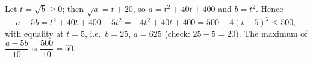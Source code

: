 Let $t=\sqrt b\ge0$; then $\sqrt a=t+20$, so $a=t^2+40t+400$ and $b=t^2$. Hence
\[
a-5b=t^2+40t+400-5t^2=-4t^2+40t+400=500-4(t-5)^2\le500,
\]
with equality at $t=5$, i.e.\ $b=25$, $a=625$ (check: $25-5=20$). The maximum of $\dfrac{a-5b}{10}$ is $\dfrac{500}{10}=\boxed{50}$.
